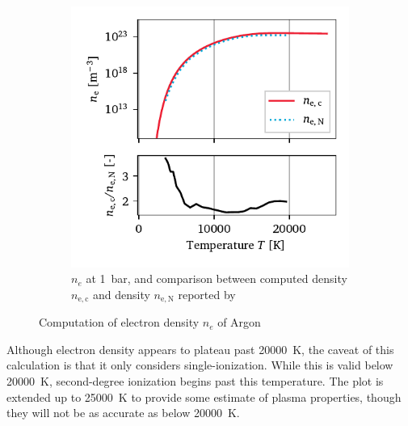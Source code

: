 \begin{figure}[h]
\begin{subfigure}[t]{3.2in}
                \includegraphics[]{assets/4 models/n_e}
                \caption{$n_e$ at \qty{1}{bar}, and comparison between computed density $n_\mathrm{e, c}$ and density $n_\mathrm{e, N}$ reported by \textcite{nassarInvestigationLasersustainedPlasma2012}}
                \label{fig:e_density_curves}
            \end{subfigure}
            \caption{Computation of electron density $n_e$ of Argon}
            \label{fig:e_density}
        \end{figure}

        Although electron density appears to plateau past \qty{20000}{K}, the caveat of this calculation is that it only considers single-ionization. While this is valid below \qty{20000}{K}, second-degree ionization begins past this temperature. The plot is extended up to \qty{25000}{K} to provide some estimate of plasma properties, though they will not be as accurate as below \qty{20000}{K}.

